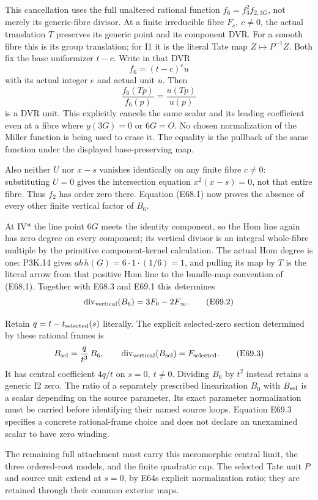 This cancellation uses the full unaltered rational function
\(f_6=f_3^2f_{2,3G}\), not merely its generic-fibre divisor.
At a finite irreducible fibre \(F_c,\ c\ne0\), the actual
translation \(T\) preserves its generic point and its component
DVR. For a smooth fibre this is its group translation; for I1 it
is the literal Tate map \(Z\mapsto P^{-1}Z\). Both fix the base
uniformizer \(t-c\). Write in that DVR
\[
 f_6=(t-c)^e u
\]
with its actual integer \(e\) and actual unit \(u\). Then
\[
 \frac{f_6(Tp)}{f_6(p)}=\frac{u(Tp)}{u(p)}
 \tag{E69.1}
\]
is a DVR unit. This explicitly cancels the same scalar and its
leading coefficient even at a fibre where \(y(3G)=0\) or
\(6G=O\). No chosen normalization of the Miller function is
being used to erase it. The equality is the pullback of the
same function under the displayed base-preserving map.

Also neither \(U\) nor \(x-s\) vanishes identically on any
finite fibre \(c\ne0\): substituting \(U=0\) gives the
intersection equation \(x^2(x-s)=0\), not that entire fibre.
Thus \(f_2\) has order zero there. Equation (E68.1) now proves
the absence of every other finite vertical factor of \(B_6\).

At IV* the line point \(6G\) meets the identity component, so
the Hom line again has zero degree on every component; its
vertical divisor is an integral whole-fibre multiple by the
primitive component-kernel calculation. The actual Hom degree
is one: P3K.14 gives \(ab\,h(G)=6\cdot1\cdot(1/6)=1\),
and pulling its map by \(T\) is the literal arrow from that
positive Hom line to the bundle-map convention of (E68.1).
Together with E68.3 and E69.1 this determines
\[
 \operatorname{div}_{\rm vertical}(B_6)=3F_0-2F_\infty.
 \tag{E69.2}
\]

Retain \(q=t-t_{\rm selected}(s)\) literally. The explicit
selected-zero section determined by these rational frames is
\[
 B_{\rm sel}=\frac{q}{t^3}\,B_6,
 \qquad \operatorname{div}_{\rm vertical}(B_{\rm sel})
             =F_{\rm selected}.
 \tag{E69.3}
\]
It has central coefficient \(4q/t\) on \(s=0,\ t\ne0\).
Dividing \(B_6\) by \(t^2\) instead retains a generic I2 zero.
The ratio of a separately prescribed linearization \(B_0\)
with \(B_{\rm sel}\) is a scalar depending on the source
parameter. Its exact parameter normalization must be carried
before identifying their named source loops. Equation E69.3
specifies a concrete rational-frame choice and does not
declare an unexamined scalar to have zero winding.

The remaining full attachment must carry this meromorphic
central limit, the three ordered-root models, and the finite
quadratic cap. The selected Tate unit \(P\) and source unit
extend at \(s=0\), by E64\textquotesingle s explicit normalization ratio; they
are retained through their common exterior maps.

